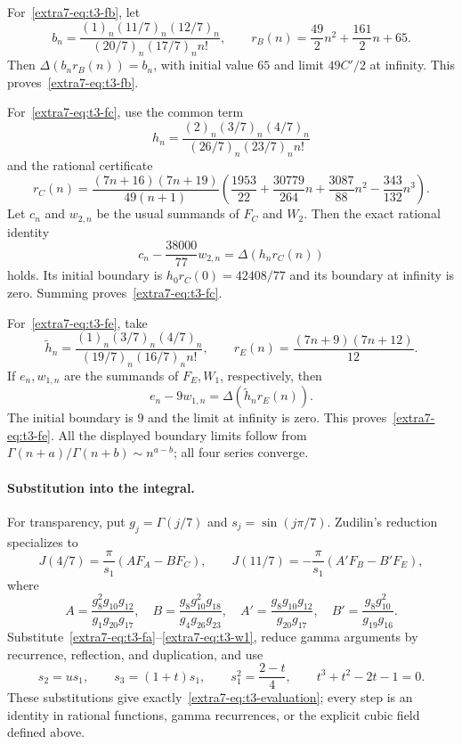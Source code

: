 \documentclass[11pt,a4paper]{article}
\theoremstyle{definition}
\theoremstyle{remark}
\numberwithin{equation}{section}
\begin{document}
For~\eqref{extra7-eq:t3-fb}, let
\[
 b_n=\frac{(1)_n(11/7)_n(12/7)_n}{(20/7)_n(17/7)_n n!},
 \qquad r_B(n)=\frac{49}{2}n^2+\frac{161}{2}n+65.
\]
Then $\Delta(b_nr_B(n))=b_n$, with initial value $65$ and limit
$49C'/2$ at infinity.  This proves~\eqref{extra7-eq:t3-fb}.

For~\eqref{extra7-eq:t3-fc}, use the common term
\[
 h_n=\frac{(2)_n(3/7)_n(4/7)_n}{(26/7)_n(23/7)_n n!}
\]
and the rational certificate
\[
 r_C(n)=\frac{(7n+16)(7n+19)}{49(n+1)}
 \left(\frac{1953}{22}+\frac{30779}{264}n
       +\frac{3087}{88}n^2-\frac{343}{132}n^3\right).
\]
Let $c_n$ and $w_{2,n}$ be the usual summands of $F_C$ and $W_2$.
Then the exact rational identity
\[
 c_n-\frac{38000}{77}w_{2,n}=\Delta(h_nr_C(n))
\]
holds.  Its initial boundary is $h_0r_C(0)=42408/77$ and its boundary
at infinity is zero.  Summing proves~\eqref{extra7-eq:t3-fc}.

For~\eqref{extra7-eq:t3-fe}, take
\[
 \widetilde h_n=\frac{(1)_n(3/7)_n(4/7)_n}
 {(19/7)_n(16/7)_n n!},\qquad
 r_E(n)=\frac{(7n+9)(7n+12)}{12}.
\]
If $e_n,w_{1,n}$ are the summands of $F_E,W_1$, respectively, then
\[
 e_n-9w_{1,n}=\Delta(\widetilde h_nr_E(n)).
\]
The initial boundary is $9$ and the limit at infinity is zero.
This proves~\eqref{extra7-eq:t3-fe}.  All the displayed boundary limits follow
from $\Gamma(n+a)/\Gamma(n+b)\sim n^{a-b}$; all four series converge.

\paragraph{Substitution into the integral.}
For transparency, put $g_j=\Gamma(j/7)$ and $s_j=\sin(j\pi/7)$.
Zudilin's reduction~\cite{extra8-zudilin} specializes to
\[
 J(4/7)=\frac{\pi}{s_1}(A F_A-B F_C),\qquad
 J(11/7)=-\frac{\pi}{s_1}(A' F_B-B' F_E),
\]
where
\[
 A=\frac{g_8^2g_{10}g_{12}}{g_1g_{20}g_{17}},\quad
 B=\frac{g_8g_{10}^2g_{18}}{g_4g_{26}g_{23}},\quad
 A'=\frac{g_8g_{10}g_{12}}{g_{20}g_{17}},\quad
 B'=\frac{g_8g_{10}^2}{g_{19}g_{16}}.
\]
Substitute~\eqref{extra7-eq:t3-fa}--\eqref{extra7-eq:t3-w1}, reduce gamma arguments
by recurrence, reflection, and duplication, and use
\[
 s_2=u s_1,\qquad s_3=(1+t)s_1,\qquad
 s_1^2=\frac{2-t}{4},\qquad t^3+t^2-2t-1=0.
\]
These substitutions give exactly~\eqref{extra7-eq:t3-evaluation}; every
step is an identity in rational functions, gamma recurrences, or the
explicit cubic field defined above.
\end{document}
